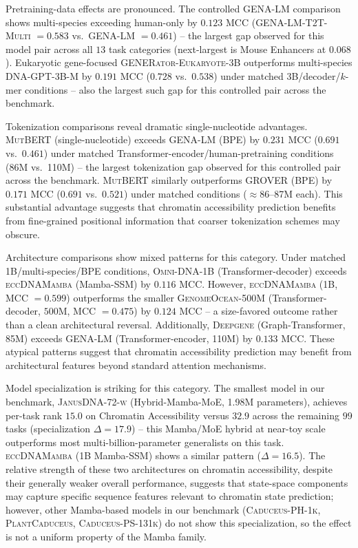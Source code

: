 \documentclass{article}
\theoremstyle{plain}
\theoremstyle{definition}
\theoremstyle{remark}
\begin{document}
Pretraining-data effects are pronounced. The controlled
\textsc{GENA-LM} comparison shows multi-species exceeding
human-only by $0.123$ MCC (\textsc{GENA-LM-T2T-Multi} $= 0.583$
vs.\ \textsc{GENA-LM} $= 0.461$) -- the largest gap observed
for this model pair across all $13$ task categories (next-largest
is Mouse Enhancers at $0.068$). Eukaryotic gene-focused
\textsc{GENERator-Eukaryote-3B} outperforms multi-species
\textsc{DNA-GPT-3B-M} by $0.191$ MCC ($0.728$ vs.\ $0.538$)
under matched 3B/decoder/$k$-mer conditions -- also the largest
such gap for this controlled pair across the benchmark.

Tokenization comparisons reveal dramatic single-nucleotide
advantages. \textsc{MutBERT} (single-nucleotide) exceeds
\textsc{GENA-LM} (BPE) by $0.231$ MCC ($0.691$ vs.\ $0.461$)
under matched Transformer-encoder/human-pretraining conditions
(86M vs.\ 110M) -- the largest tokenization gap observed for
this controlled pair across the benchmark. \textsc{MutBERT}
similarly outperforms \textsc{GROVER} (BPE) by $0.171$ MCC
($0.691$ vs.\ $0.521$) under matched conditions
($\approx$86--87M each). This substantial advantage suggests
that chromatin accessibility prediction benefits from
fine-grained positional information that coarser tokenization
schemes may obscure.

Architecture comparisons show mixed patterns for this category.
Under matched 1B/multi-species/BPE conditions,
\textsc{Omni-DNA-1B} (Transformer-decoder) exceeds
\textsc{eccDNAMamba} (Mamba-SSM) by $0.116$ MCC. However,
\textsc{eccDNAMamba} (1B, MCC $= 0.599$) outperforms the smaller
\textsc{GenomeOcean-500M} (Transformer-decoder, $500$M, MCC $=
0.475$) by $0.124$ MCC -- a size-favored outcome rather than a
clean architectural reversal. Additionally,
\textsc{Deepgene} (Graph-Transformer, 85M) exceeds
\textsc{GENA-LM} (Transformer-encoder, 110M) by $0.133$ MCC.
These atypical patterns suggest that chromatin accessibility
prediction may benefit from architectural features beyond
standard attention mechanisms.

Model specialization is striking for this category. The smallest
model in our benchmark, \textsc{JanusDNA-72-w} (Hybrid-Mamba-MoE,
1.98M parameters), achieves per-task rank $15.0$ on Chromatin
Accessibility versus $32.9$ across the remaining $99$ tasks
(specialization $\Delta = 17.9$) -- this Mamba/MoE hybrid at
near-toy scale outperforms most multi-billion-parameter
generalists on this task. \textsc{eccDNAMamba} (1B Mamba-SSM)
shows a similar pattern ($\Delta = 16.5$). The relative strength
of these two architectures on chromatin accessibility, despite
their generally weaker overall performance, suggests that
state-space components may capture specific sequence features
relevant to chromatin state prediction; however, other
Mamba-based models in our benchmark (\textsc{Caduceus-PH-1k},
\textsc{PlantCaduceus}, \textsc{Caduceus-PS-131k}) do not show
this specialization, so the effect is not a uniform property of
the Mamba family.
\end{document}
